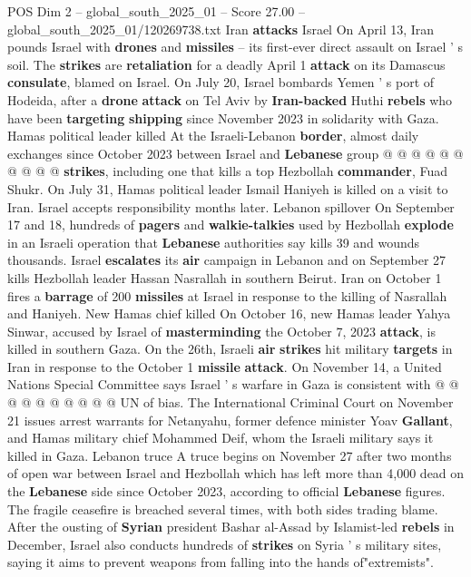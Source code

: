 \begin{textsample}{POS Dim 2 – global\_south\_2025\_01 – Score 27.00 – global\_south\_2025\_01/120269738.txt}
Iran \textbf{attacks} Israel On April 13, Iran pounds Israel with \textbf{drones} and \textbf{missiles} -- its first-ever direct assault on Israel ' s soil.
The \textbf{strikes} are \textbf{retaliation} for a deadly April 1 \textbf{attack} on its Damascus \textbf{consulate}, blamed on Israel.
On July 20, Israel bombards Yemen ' s port of Hodeida, after a \textbf{drone} \textbf{attack} on Tel Aviv by \textbf{Iran-backed} Huthi \textbf{rebels} who have been \textbf{targeting} \textbf{shipping} since November 2023 in solidarity with Gaza.
Hamas political leader killed At the Israeli-Lebanon \textbf{border}, almost daily exchanges since October 2023 between Israel and \textbf{Lebanese} group @ @ @ @ @ @ @ @ @ @ \textbf{strikes}, including one that kills a top Hezbollah \textbf{commander}, Fuad Shukr.
On July 31, Hamas political leader Ismail Haniyeh is killed on a visit to Iran.
Israel accepts responsibility months later.
Lebanon spillover On September 17 and 18, hundreds of \textbf{pagers} and \textbf{walkie-talkies} used by Hezbollah \textbf{explode} in an Israeli operation that \textbf{Lebanese} authorities say kills 39 and wounds thousands.
Israel \textbf{escalates} its \textbf{air} campaign in Lebanon and on September 27 kills Hezbollah leader Hassan Nasrallah in southern Beirut.
Iran on October 1 fires a \textbf{barrage} of 200 \textbf{missiles} at Israel in response to the killing of Nasrallah and Haniyeh.
New Hamas chief killed On October 16, new Hamas leader Yahya Sinwar, accused by Israel of \textbf{masterminding} the October 7, 2023 \textbf{attack}, is killed in southern Gaza.
On the 26th, Israeli \textbf{air} \textbf{strikes} hit military \textbf{targets} in Iran in response to the October 1 \textbf{missile} \textbf{attack}.
On November 14, a United Nations Special Committee says Israel ' s warfare in Gaza is consistent with @ @ @ @ @ @ @ @ @ @ UN of bias.
The International Criminal Court on November 21 issues arrest warrants for Netanyahu, former defence minister Yoav \textbf{Gallant}, and Hamas military chief Mohammed Deif, whom the Israeli military says it killed in Gaza.
Lebanon truce A truce begins on November 27 after two months of open war between Israel and Hezbollah which has left more than 4,000 dead on the \textbf{Lebanese} side since October 2023, according to official \textbf{Lebanese} figures.
The fragile ceasefire is breached several times, with both sides trading blame.
After the ousting of \textbf{Syrian} president Bashar al-Assad by Islamist-led \textbf{rebels} in December, Israel also conducts hundreds of \textbf{strikes} on Syria ' s military sites, saying it aims to prevent weapons from falling into the hands of"extremists".

\end{textsample}

